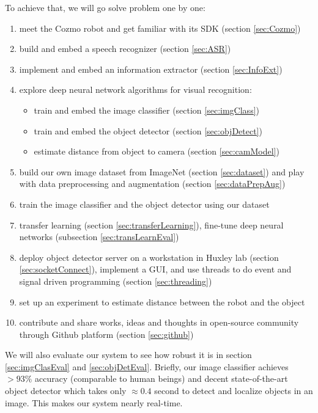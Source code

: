 To achieve that, we will go solve problem one by one: 
\begin{enumerate}
	\item meet the Cozmo robot and get familiar with its SDK (section \ref{sec:Cozmo})
	\item build and embed a speech recognizer (section \ref{sec:ASR})
	\item implement and embed an information extractor (section \ref{sec:InfoExt})
	\item explore deep neural network algorithms for visual recognition: 
	\begin{itemize}
		\item train and embed the image classifier (section \ref{sec:imgClass})
		\item train and embed the object detector (section \ref{sec:objDetect})
		\item estimate distance from object to camera (section \ref{sec:camModel})
	\end{itemize}
	\item build our own image dataset from ImageNet (section \ref{sec:dataset}) and play with data preprocessing and augmentation (section \ref{sec:dataPrepAug})
	\item train the image classifier and the object detector using our dataset
	\item transfer learning (section \ref{sec:transferLearning}), fine-tune deep neural networks (subsection \ref{sec:transLearnEval})
	\item deploy object detector server on a workstation in Huxley lab (section \ref{sec:socketConnect}), implement a GUI, and use threads to do event and signal driven programming (section \ref{sec:threading})
	\item set up an experiment to estimate distance between the robot and the object
	\item contribute and share works, ideas and thoughts in open-source community through Github platform (section \ref{sec:github})	
\end{enumerate} 

We will also evaluate our system to see how robust it is in section \ref{sec:imgClasEval} and \ref{sec:objDetEval}. Briefly, our image classifier achieves $> 93\%$ accuracy (comparable to human beings) and decent state-of-the-art object detector which takes only $\approx 0.4$ second to detect and localize objects in an image. This makes our system nearly real-time.


%
%
